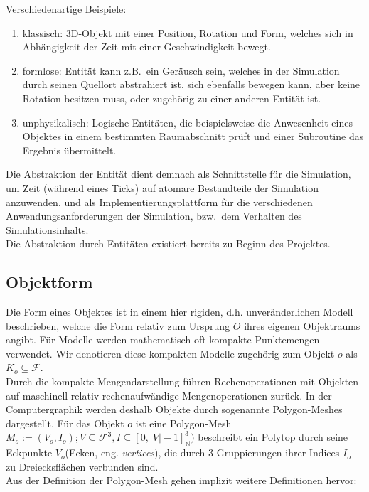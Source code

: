 Verschiedenartige Beispiele:
\begin{enumerate}
\item klassisch: 3D-Objekt mit einer Position, Rotation und Form, welches sich in Abhängigkeit der Zeit mit einer Geschwindigkeit bewegt.\\
\item formlose: Entität kann z.B.~ein Geräusch sein, welches in der Simulation durch seinen Quellort abstrahiert ist, sich ebenfalls bewegen kann, aber keine Rotation besitzen muss, oder zugehörig zu einer anderen Entität ist.
\item unphysikalisch: Logische Entitäten, die beispielsweise die Anwesenheit eines Objektes in einem bestimmten Raumabschnitt prüft und einer Subroutine das Ergebnis übermittelt.
\end{enumerate}
Die Abstraktion der Entität dient demnach als Schnittstelle für die Simulation, um Zeit (während eines Ticks) auf atomare Bestandteile der Simulation anzuwenden, und als Implementierungsplattform für die verschiedenen Anwendungsanforderungen der Simulation, bzw.~dem Verhalten des Simulationsinhalts.\\

Die Abstraktion durch Entitäten existiert bereits zu Beginn des Projektes.

\subsection{Objektform}
\label{object_form}
Die Form eines Objektes ist in einem hier rigiden, d.h. unveränderlichen Modell beschrieben, welche die Form relativ zum Ursprung $O$ ihres eigenen Objektraums angibt.
Für Modelle werden mathematisch oft kompakte Punktemengen verwendet. Wir denotieren diese kompakten Modelle zugehörig zum Objekt $o$ als $ K_o \subseteq \mathcal{F}$.\\

Durch die kompakte Mengendarstellung führen Rechenoperationen mit Objekten auf maschinell relativ rechenaufwändige Mengenoperationen zurück. In der Computergraphik werden deshalb Objekte durch sogenannte Polygon-Meshes dargestellt. 
Für das Objekt $o$ ist eine Polygon-Mesh $M_o := (V_o, I_o); V \subseteq \mathcal{F}^3, I \subseteq [0, |V|-1]_\mathbb{N}^3 )$ beschreibt ein Polytop durch seine Eckpunkte $V_o$(Ecken, eng. \textit{vertices}), die durch 3-Gruppierungen ihrer Indices $I_o$ zu Dreiecksflächen verbunden sind.\\
Aus der Definition der Polygon-Mesh gehen implizit weitere Definitionen hervor:


